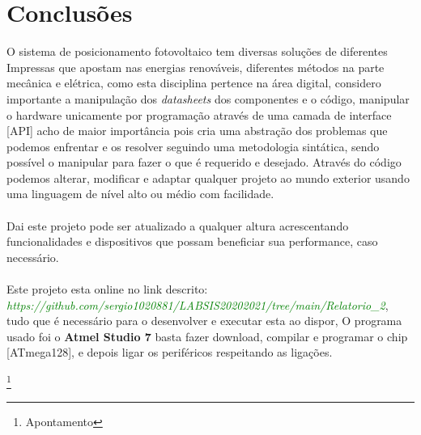 \newpage
\section{Conclusões}
\qquad O sistema de posicionamento fotovoltaico tem diversas soluções de diferentes Impressas que apostam nas energias renováveis, diferentes métodos na parte mecânica e elétrica, como esta disciplina pertence na área digital, considero importante a manipulação dos {\it datasheets} dos componentes e o código, manipular o hardware unicamente por programação através de uma camada de interface [API] acho de maior importância pois cria uma abstração dos problemas que podemos enfrentar e os resolver seguindo uma metodologia sintática, sendo possível o manipular para fazer o que é requerido e desejado. Através do código podemos alterar, modificar e adaptar qualquer projeto ao mundo exterior usando uma linguagem de nível alto ou médio com facilidade.\\
\\
Dai este projeto pode ser atualizado a qualquer altura acrescentando funcionalidades e dispositivos que possam beneficiar sua performance, caso necessário.\\
\\
Este projeto esta online no link descrito: \\ {\it \textcolor{green}{https://github.com/sergio1020881/LABSIS20202021/tree/main/Relatorio\_2}},\\
tudo que é necessário para o desenvolver e executar esta ao dispor, O programa usado foi o {\bf Atmel Studio 7} basta fazer download, compilar e programar o chip [ATmega128], e depois ligar os periféricos respeitando as ligações.
\newpage
\listoffigures
\cite{*}

\newpage
\footnote{Apontamento}

